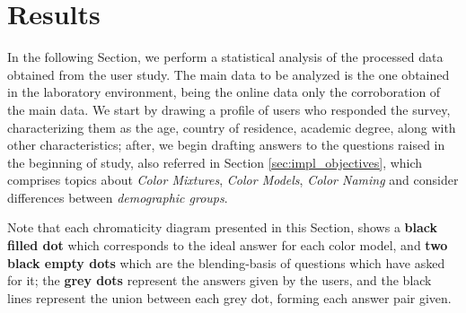 %
%
\section{Results}
\label{sec:results_results}
%
In the following Section, we perform a statistical analysis of the processed data obtained from the user study. The main data to be analyzed is the one obtained in the
laboratory environment, being the online data only the corroboration of the main data. We start by drawing a profile of users who responded the survey, characterizing them as the age,
country of residence, academic degree, along with other characteristics; after, we begin drafting answers to the questions raised in the beginning of study, also referred in Section
\ref{sec:impl_objectives}, which comprises topics about \emph{Color Mixtures}, \emph{Color Models}, \emph{Color Naming} and consider differences between \emph{demographic groups}. \par
%
Note that each chromaticity diagram presented in this Section, shows a \textbf{black filled dot} which corresponds to the ideal answer for each color model, and \textbf{two black empty dots} which are the
blending-basis of questions which have asked for it; the \textbf{grey dots} represent the answers given by the users, and the black lines represent the union between each grey dot, forming each
answer pair given. \par
%
